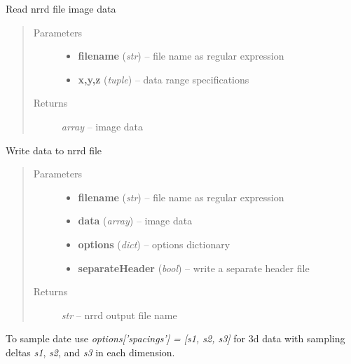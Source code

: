 \documentclass[letterpaper,10pt,english]{sphinxmanual}
\begin{document}

\begin{fulllineitems}
\label{api/ClearMap.IO:ClearMap.IO.NRRD.readData}
Read nrrd file image data
\begin{quote}\begin{description}
\item[{Parameters}] \leavevmode\begin{itemize}
\item {} 
\textbf{filename} (\emph{str}) --
file name as regular expression

\item {} 
\textbf{x,y,z} (\emph{tuple}) --
data range specifications

\end{itemize}

\item[{Returns}] \leavevmode
\emph{array} --
image data

\end{description}\end{quote}

\end{fulllineitems}


\begin{fulllineitems}
\label{api/ClearMap.IO:ClearMap.IO.NRRD.writeData}
Write data to nrrd file
\begin{quote}\begin{description}
\item[{Parameters}] \leavevmode\begin{itemize}
\item {} 
\textbf{filename} (\emph{str}) --
file name as regular expression

\item {} 
\textbf{data} (\emph{array}) --
image data

\item {} 
\textbf{options} (\emph{dict}) --
options dictionary

\item {} 
\textbf{separateHeader} (\emph{bool}) --
write a separate header file

\end{itemize}

\item[{Returns}] \leavevmode
\emph{str} --
nrrd output file name

\end{description}\end{quote}

To sample date use \emph{options{[}'spacings'{]} = {[}s1, s2, s3{]}} for
3d data with sampling deltas \emph{s1}, \emph{s2}, and \emph{s3} in each dimension.

\end{fulllineitems}
\end{document}
